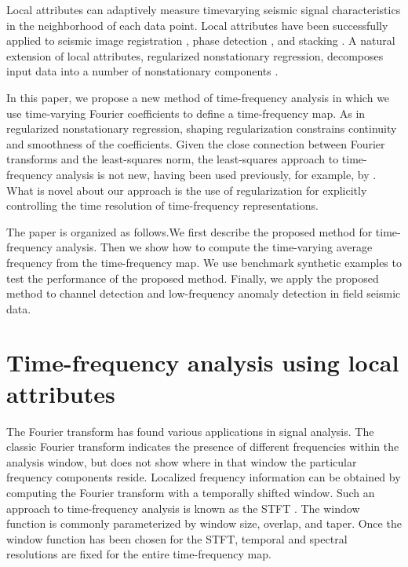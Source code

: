 Local attributes \cite[]{Fomel2007a} can adaptively measure timevarying
seismic signal characteristics in the neighborhood of each
data point. Local attributes have been successfully applied to
seismic image registration \cite[]{Fomel2009Jin}, phase detection
\cite[]{van2009, Fomel2010van}, and stacking \cite[]{Liu2009fomel, Liu2011fomel}. A natural extension of local
attributes, regularized nonstationary regression, decomposes input
data into a number of nonstationary components \cite[]{Fomel2009, Liu2010, Liu2011chen}.

In this paper, we propose a new method of time-frequency analysis
in which we use time-varying Fourier coefficients to define a
time-frequency map. As in regularized nonstationary regression,
shaping regularization \cite[]{Fomel2007b} constrains continuity and
smoothness of the coefficients. Given the close connection between
Fourier transforms and the least-squares norm, the least-squares
approach to time-frequency analysis is not new, having been used
previously, for example, by \cite{Youn1985}. What is novel
about our approach is the use of regularization for explicitly
controlling the time resolution of time-frequency representations.

The paper is organized as follows.We first describe the proposed
method for time-frequency analysis. Then we show how to compute
the time-varying average frequency from the time-frequency map.
We use benchmark synthetic examples to test the performance of
the proposed method. Finally, we apply the proposed method to
channel detection and low-frequency anomaly detection in field
seismic data.

\section{Time-frequency analysis using local attributes}

The Fourier transform has found various applications in signal
analysis. The classic Fourier transform indicates the presence of different
frequencies within the analysis window, but does not show
where in that window the particular frequency components reside.
Localized frequency information can be obtained by computing the
Fourier transform with a temporally shifted window. Such an
approach to time-frequency analysis is known as the STFT \cite[]{Allen1977}. 
The window function is commonly parameterized by window
size, overlap, and taper. Once the window function has been
chosen for the STFT, temporal and spectral resolutions are fixed for
the entire time-frequency map.
 
